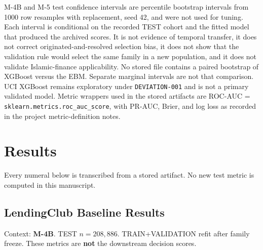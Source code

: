 \documentclass{ieeeaccess}
\begin{document}
M-4B and M-5 test confidence intervals are percentile bootstrap intervals from 1000 row resamples with replacement, seed 42, and were not used for tuning. Each interval is conditional on the recorded TEST cohort and the fitted model that produced the archived scores. It is not evidence of temporal transfer, it does not correct originated-and-resolved selection bias, it does not show that the validation rule would select the same family in a new population, and it does not validate Islamic-finance applicability. No stored file contains a paired bootstrap of XGBoost versus the EBM. Separate marginal intervals are not that comparison. UCI XGBoost remains exploratory under \texttt{DEVIATION-001} and is not a primary validated model. Metric wrappers used in the stored artifacts are ROC-AUC = \texttt{sklearn.metrics.roc\_auc\_score}, with PR-AUC, Brier, and log loss as recorded in the project metric-definition notes.


\section{Results}

Every numeral below is transcribed from a stored artifact. No new test metric is computed in this manuscript.

\subsection{LendingClub Baseline Results}

Context: \textbf{M-4B}. TEST \(n=208{,}886\). TRAIN+VALIDATION refit after family freeze. These metrics are \textbf{not} the downstream decision scores.
\end{document}
